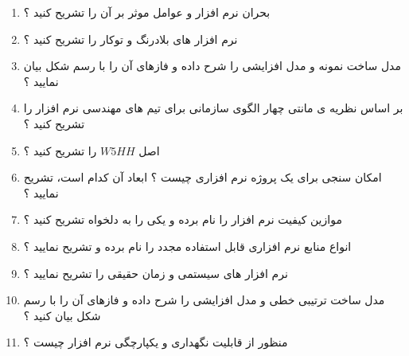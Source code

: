 \documentclass{article}
\begin{document}
\begin{enumerate}
	\item بحران نرم افزار و عوامل موثر بر آن را تشریح کنید ؟
	\item نرم افزار های بلادرنگ و توکار را تشریح کنید ؟
	\item مدل ساخت نمونه و مدل افزایشی را شرح داده و فازهای آن را با رسم شکل بیان نمایید ؟
	\item بر اساس نظریه ی مانتی چهار الگوی سازمانی برای تیم های مهندسی نرم افزار را تشریح کنید ؟
	\item اصل $W5HH$ را تشریح کنید ؟
	\item امکان سنجی برای یک پروژه نرم افزاری چیست ؟ ابعاد آن کدام است، تشریح نمایید ؟
	\item موازین کیفیت نرم افزار را نام برده و یکی را به دلخواه تشریح کنید ؟
	\item انواع منابع نرم افزاری قابل استفاده مجدد را نام برده و تشریح نمایید ؟
	\item نرم افزار های سیستمی و زمان حقیقی را تشریح نمایید ؟
	\item مدل ساخت ترتیبی خطی و مدل افزایشی را شرح داده و فازهای آن را با رسم شکل بیان کنید ؟
	\item منظور از قابلیت نگهداری و یکپارچگی نرم افزار چیست ؟ 
\end{enumerate}
\end{document}
